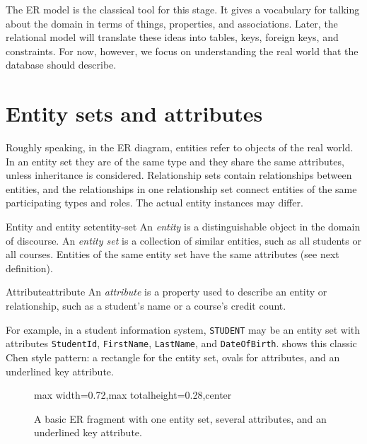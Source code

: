 \documentclass[11pt,a4paper,openany]{book}
\newcommand{\keyattr}[1]{\underline{#1}}
\begin{document}
The ER model is the classical tool for this stage. It gives a vocabulary for talking about the domain in terms of things, properties, and associations. Later, the relational model will translate these ideas into tables, keys, foreign keys, and constraints. For now, however, we focus on understanding the real world that the database should describe.

\section{Entity sets and attributes}

Roughly speaking, in the ER diagram, entities refer to objects of the real world. In an entity set they are of the same type and they share the same attributes, unless inheritance is considered. Relationship sets contain relationships between entities, and the relationships in one relationship set connect entities of the same participating types and roles. The actual entity instances may differ.

\begin{definition}{Entity and entity set}{entity-set}
An \emph{entity} is a distinguishable object in the domain of discourse. An \emph{entity set} is a collection of similar entities, such as all students or all courses. Entities of the same entity set have the same attributes (see next definition). 
\end{definition}

\begin{definition}{Attribute}{attribute}
An \emph{attribute} is a property used to describe an entity or relationship, such as a student's name or a course's credit count.
\end{definition}

For example, in a student information system, \texttt{STUDENT} may be an entity set with attributes \texttt{StudentId}, \texttt{FirstName}, \texttt{LastName}, and \texttt{DateOfBirth}.  shows this classic Chen style pattern: a rectangle for the entity set, ovals for attributes, and an underlined key attribute.

\begin{figure}[tbp]
\centering
\begin{adjustbox}{max width=0.72\linewidth,max totalheight=0.28\textheight,center}
\end{adjustbox}
\caption{A basic ER fragment with one entity set, several attributes, and an underlined key attribute.}
\label{fig:er-student-basic}
\end{figure}
\end{document}
